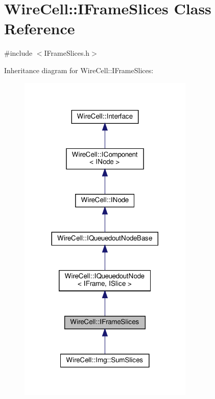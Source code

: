 \hypertarget{class_wire_cell_1_1_i_frame_slices}{}\section{Wire\+Cell\+:\+:I\+Frame\+Slices Class Reference}
\label{class_wire_cell_1_1_i_frame_slices}


{\ttfamily \#include $<$I\+Frame\+Slices.\+h$>$}



Inheritance diagram for Wire\+Cell\+:\+:I\+Frame\+Slices\+:
\nopagebreak
\begin{figure}[H]
\begin{center}
\leavevmode
\includegraphics[width=236pt]{class_wire_cell_1_1_i_frame_slices__inherit__graph}
\end{center}
\end{figure}


